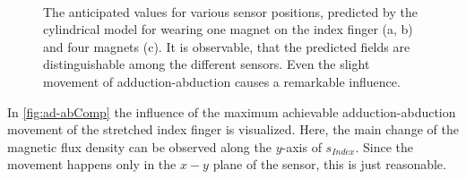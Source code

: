 \begin{figure}[!htb]
\centering
{} 
{}\\

\caption[Simulating the magnetic field for various finger movements]{The anticipated values for various sensor positions, predicted by the cylindrical model for wearing one magnet on the index finger (a, b) and four magnets (c). It is observable, that the predicted fields are distinguishable among the different sensors. Even the slight movement of adduction-abduction causes a remarkable influence.}
\label{fig:compMovement}
\end{figure}
In \ref{fig:ad-abComp} the influence of the maximum achievable adduction-abduction movement of the stretched index finger is visualized. Here, the main change of the magnetic flux density can be observed along the $ y $-axis of $ s_{Index} $. Since the movement happens only in the $ x-y $ plane of the sensor, this is just reasonable.\\

